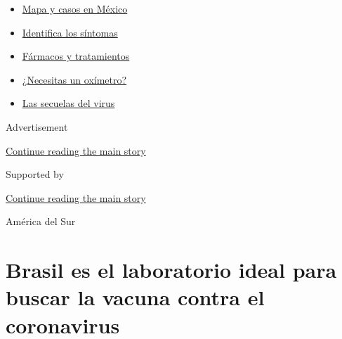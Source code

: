 \begin{itemize}
\tightlist
\item
  \href{https://www.nytimes3xbfgragh.onion/es/interactive/2020/espanol/america-latina/coronavirus-en-mexico.html?name=styln-coronavirus-es\&region=TOP_BANNER\&variant=undefined\&block=storyline_menu_recirc\&action=click\&pgtype=Article\&impression_id=e3df5130-e39f-11ea-970e-7dcf3acfc0e1}{Mapa
  y casos en México}
\item
  \href{https://www.nytimes3xbfgragh.onion/es/interactive/2020/08/06/espanol/ciencia-y-tecnologia/tengo-covid-19-sintomas.html?name=styln-coronavirus-es\&region=TOP_BANNER\&variant=undefined\&block=storyline_menu_recirc\&action=click\&pgtype=Article\&impression_id=e3df5131-e39f-11ea-970e-7dcf3acfc0e1}{Identifica
  los síntomas}
\item
  \href{https://www.nytimes3xbfgragh.onion/es/interactive/2020/science/coronavirus-tratamientos-curas.html?name=styln-coronavirus-es\&region=TOP_BANNER\&variant=undefined\&block=storyline_menu_recirc\&action=click\&pgtype=Article\&impression_id=e3df5132-e39f-11ea-970e-7dcf3acfc0e1}{Fármacos
  y tratamientos}
\item
  \href{https://www.nytimes3xbfgragh.onion/es/2020/04/29/espanol/estilos-de-vida/oximetro-para-que-sirve.html?name=styln-coronavirus-es\&region=TOP_BANNER\&variant=undefined\&block=storyline_menu_recirc\&action=click\&pgtype=Article\&impression_id=e3df5133-e39f-11ea-970e-7dcf3acfc0e1}{¿Necesitas
  un oxímetro?}
\item
  \href{https://www.nytimes3xbfgragh.onion/es/2020/07/02/espanol/ciencia-y-tecnologia/sobrevivientes-coronavirus-recuperacion.html?name=styln-coronavirus-es\&region=TOP_BANNER\&variant=undefined\&block=storyline_menu_recirc\&action=click\&pgtype=Article\&impression_id=e3df5134-e39f-11ea-970e-7dcf3acfc0e1}{Las
  secuelas del virus}
\end{itemize}

Advertisement

\protect\hyperlink{after-top}{Continue reading the main story}

Supported by

\protect\hyperlink{after-sponsor}{Continue reading the main story}

América del Sur

\hypertarget{brasil-es-el-laboratorio-ideal-para-buscar-la-vacuna-contra-el-coronavirus}{%
\section{Brasil es el laboratorio ideal para buscar la vacuna contra el
coronavirus}\label{brasil-es-el-laboratorio-ideal-para-buscar-la-vacuna-contra-el-coronavirus}}

